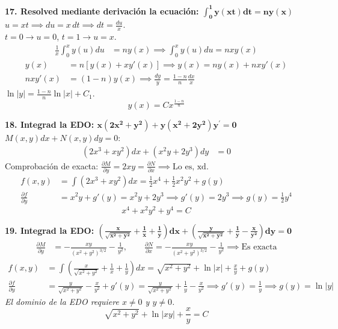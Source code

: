 \documentclass[11pt, a4paper]{article}
\begin{document}
\noindent\textbf{17. Resolved mediante derivación la ecuación: $\bm{\int_{0}^{1}y(xt)dt=ny(x)}$} \\
$u = xt \implies du = x\,dt \implies dt = \frac{du}{x}$.\\
$t=0 \to u=0$, $t=1 \to u=x$.
\begin{align*}
\frac{1}{x} \int_{0}^{x} y(u) du &= n y(x) \implies \int_{0}^{x} y(u) du = n x y(x)
\end{align*}
\begin{align*}
y(x) &= n \left[ y(x) + x y'(x) \right] \implies y(x) = n y(x) + n x y'(x) \\
n x y'(x) &= (1-n) y(x) \implies \frac{dy}{y} = \frac{1-n}{n} \frac{dx}{x}
\end{align*}
$\ln|y| = \frac{1-n}{n}\ln|x| + C_1$.
\[
\boxed{y(x) = C x^{\frac{1-n}{n}}}
\]


\noindent\textbf{18. Integrad la EDO: $\bm{x(2x^{2}+y^{2})+y(x^{2}+2y^{2})y^{\prime}=0}$} \\
$M(x,y)dx + N(x,y)dy = 0$:
\begin{align*}
(2x^3 + xy^2)dx + (x^2y + 2y^3)dy &= 0
\end{align*}
Comprobación de exacta: $\frac{\partial M}{\partial y} = 2xy = \frac{\partial N}{\partial x} \implies \text{Lo es, xd}$. \\
\begin{align*}
f(x,y) &= \int (2x^3 + xy^2)dx = \frac{1}{2}x^4 + \frac{1}{2}x^2y^2 + g(y) \\
\frac{\partial f}{\partial y} &= x^2y + g'(y) = x^2y + 2y^3 \implies g'(y) = 2y^3 \implies g(y) = \frac{1}{2}y^4
\end{align*}
\[
\boxed{x^4 + x^2y^2 + y^4 = C}
\]


\noindent\textbf{19. Integrad la EDO: $\bm{\left(\frac{x}{\sqrt{x^{2}+y^{2}}}+\frac{1}{x}+\frac{1}{y}\right)dx+\left(\frac{y}{\sqrt{x^{2}+y^{2}}}+\frac{1}{y}-\frac{x}{y^{2}}\right)dy=0}$} \\
\begin{align*}
\frac{\partial M}{\partial y} &= -\frac{xy}{(x^2+y^2)^{3/2}} - \frac{1}{y^2}, \qquad \frac{\partial N}{\partial x} = -\frac{xy}{(x^2+y^2)^{3/2}} - \frac{1}{y^2} \implies \text{Es exacta}
\end{align*}
\begin{align*}
f(x,y) &= \int \left(\frac{x}{\sqrt{x^2+y^2}} + \frac{1}{x} + \frac{1}{y}\right) dx = \sqrt{x^2+y^2} + \ln|x| + \frac{x}{y} + g(y) \\
\frac{\partial f}{\partial y} &= \frac{y}{\sqrt{x^2+y^2}} - \frac{x}{y^2} + g'(y) = \frac{y}{\sqrt{x^2+y^2}} + \frac{1}{y} - \frac{x}{y^2} \implies g'(y) = \frac{1}{y} \implies g(y) = \ln|y|
\end{align*}
\textit{El dominio de la EDO requiere $x \neq 0$ y $y \neq 0$.}
\[
\boxed{\sqrt{x^2+y^2} + \ln|xy| + \frac{x}{y} = C}
\]
\end{document}
